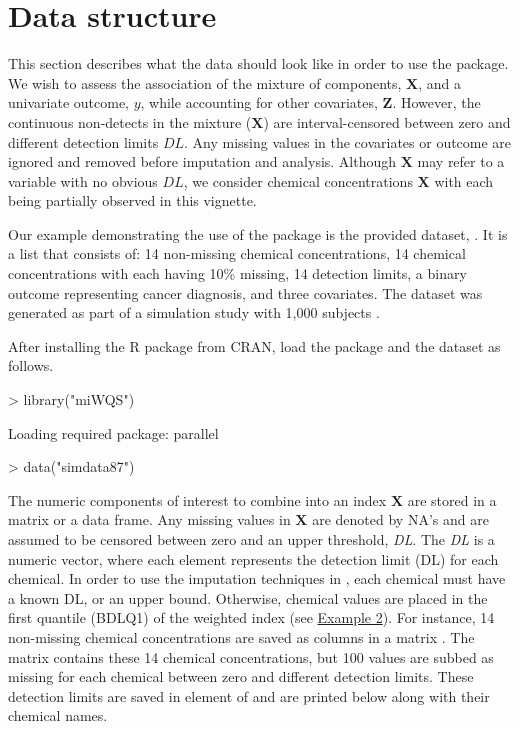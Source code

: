 \hypertarget{data-structure}{%
\section{Data structure}\label{data-structure}}

This section describes what the data should look like in order to use
the  package. We wish to assess the association of the
mixture of components, \(\boldsymbol{X}\), and a univariate outcome,
\(y\), while accounting for other covariates, \(\boldsymbol{Z}\).
However, the continuous non-detects in the mixture (\(\boldsymbol{X}\))
are interval-censored between zero and different detection limits
\(DL\). Any missing values in the covariates or outcome are ignored and
removed before imputation and analysis. Although \(\boldsymbol{X}\) may
refer to a variable with no obvious \(DL\), we consider chemical
concentrations \(\boldsymbol{X}\) with each being partially observed in
this vignette.

Our example demonstrating the use of the  package is the
provided dataset, . It is a list that consists of: 14
non-missing chemical concentrations, 14 chemical concentrations with
each having 10\% missing, 14 detection limits, a binary outcome
representing cancer diagnosis, and three covariates. The dataset was
generated as part of a simulation study with 1,000 subjects
\citep{hargartenAccountingUncertaintyDue2020}.

After installing the R package  from CRAN, load the package
and the dataset as follows.

\begin{Schunk}
\begin{Sinput}
> library("miWQS")
\end{Sinput}
\begin{Soutput}
Loading required package: parallel
\end{Soutput}
\begin{Sinput}
> data("simdata87")
\end{Sinput}
\end{Schunk}

The numeric components of interest to combine into an index
\(\boldsymbol{X}\) are stored in a matrix or a data frame. Any missing
values in \(\boldsymbol{X}\) are denoted by NA's and are assumed to be
censored between zero and an upper threshold, \emph{DL}. The \emph{DL}
is a numeric vector, where each element represents the detection limit
(DL) for each chemical. In order to use the imputation techniques in
, each chemical must have a known DL, or an upper bound.
Otherwise, chemical values are placed in the first quantile (BDLQ1) of
the weighted index (see \protect\hyperlink{Example-2}{Example 2}). For
instance, 14 non-missing chemical concentrations are saved as columns in
a matrix . The matrix 
contains these 14 chemical concentrations, but 100 values are subbed as
missing for each chemical between zero and different detection limits.
These detection limits are saved in element  of
 and are printed below along with their chemical names.

